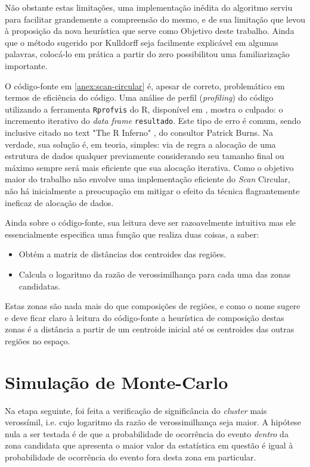 \documentclass[
	12pt,				%
	openright,			%
	twoside,			%
	a4paper,			%
	english,			%
	french,				%
	spanish,			%
	brazil,				%
	]{abntex2}
\begin{document}
Não obstante estas limitações, uma implementação inédita do algoritmo serviu para facilitar grandemente a compreensão do mesmo, e de sua limitação que levou à proposição da nova heurística que serve como Objetivo deste trabalho. Ainda que o método sugerido por Kulldorff seja facilmente explicável em algumas palavras, colocá-lo em prática a partir do zero possibilitou uma familiarização importante.

O código-fonte em \ref{anex:scan-circular} é, apesar de correto, problemático em termos de eficiência do código. Uma análise de perfil (\textit{profiling}) do código utilizando a ferramenta \texttt{Rprofvis} do R, disponível em \cite{_rpubs_????}, mostra o culpado: o incremento iterativo do \textit{data frame} \texttt{resultado}. Este tipo de erro é comum, sendo inclusive citado no text "The R Inferno" \cite{burns2012r}, do consultor Patrick Burns. Na verdade, sua solução é, em teoria, simples: via de regra a alocação de uma estrutura de dados qualquer previamente considerando seu tamanho final ou máximo sempre será mais eficiente que sua alocação iterativa. Como o objetivo maior do trabalho não envolve uma implementação eficiente do \textit{Scan} Circular, não há inicialmente a preocupação em mitigar o efeito da técnica flagrantemente ineficaz de alocação de dados. 

Ainda sobre o código-fonte, sua leitura deve ser razoavelmente intuitiva mas ele essencialmente especifica uma função que realiza duas coisas, a saber: 

\begin{itemize}
\item Obtém a matriz de distâncias dos centroides das regiões.
\item Calcula o logaritmo da razão de verossimilhança para cada uma das zonas candidatas.
\end{itemize}

Estas zonas são nada mais do que composições de regiões, e como o nome sugere e deve ficar claro à leitura do código-fonte a heurística de composição destas zonas é a distância a partir de um centroide inicial até os centroides das outras regiões no espaço.

\newpage
\section{Simulação de Monte-Carlo}

Na etapa seguinte, foi feita a verificação de significância do \textit{cluster} mais verossímil, i.e. cujo logaritmo da razão de verossimilhança seja maior. A hipótese nula a ser testada é de que a probabilidade de ocorrência do evento \textit{dentro} da zona candidata que apresenta o maior valor da estatística em questão é igual à probabilidade de ocorrência do evento fora desta zona em particular.
\end{document}

